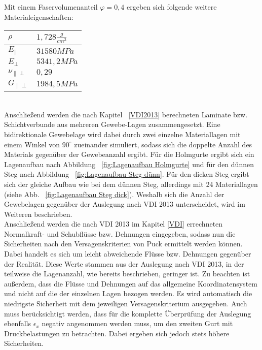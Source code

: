 \noindent Mit einem Faservolumenanteil $\varphi=0,4$ ergeben sich folgende weitere Materialeigenschaften:\\

\begin{tabular}{ll}
	$\rho$ & $1,728 \frac{g}{cm^{3}}$ \\
	\hline
	$E_{\parallel}$ & $31580 MPa$\\
	\hline
	$E_{\perp}$ & $5341,2MPa$\\
	\hline
	$\nu_{\parallel\perp}$ & $0,29$\\
	\hline
	$G_{\parallel\perp}$ & $1984,5 MPa$\\
\end{tabular}\\

\noindent Anschließend werden die nach Kapitel ~\ref{VDI2013} berechneten Laminate bzw. Schichtverbunde aus mehreren Gewebe-Lagen zusammengesetzt. Eine bidirektionale Gewebelage wird dabei durch zwei einzelne Materiallagen mit einem Winkel von $90^{\circ}$ zueinander simuliert, sodass sich die doppelte Anzahl des Materials gegenüber der Gewebeanzahl ergibt. Für die Holmgurte ergibt sich ein Lagenaufbau nach Abbildung ~\ref{fig:Lagenaufbau Holmgurte} und für den dünnen Steg nach Abbildung ~\ref{fig:Lagenaufbau Steg dünn}. Für den dicken Steg ergibt sich der gleiche Aufbau wie bei dem dünnen Steg, allerdings mit 24 Materiallagen (siehe Abb. ~\ref{fig:Lagenaufbau Steg dick}). Weshalb sich die Anzahl der Gewebelagen gegenüber der Auslegung nach VDI 2013 unterscheidet, wird im Weiteren beschrieben.\\ 

\noindent Anschließend werden die nach VDI 2013 im Kapitel \ref{VDI} errechneten Normalkraft- und Schubflüsse bzw. Dehnungen eingegeben, sodass nun die Sicherheiten nach den Versagenskriterien von Puck ermittelt werden können. Dabei handelt es sich um leicht abweichende Flüsse bzw. Dehnungen gegenüber der Realität. Diese Werte stammen aus der Auslegung nach VDI 2013, in der teilweise die Lagenanzahl, wie bereits beschrieben, geringer ist. Zu beachten ist außerdem, dass die Flüsse und Dehnungen auf das allgemeine Koordinatensystem und nicht auf die der einzelnen Lagen bezogen werden. Es wird automatisch die niedrigste Sicherheit mit dem jeweiligen Versagenskriterium ausgegeben. Auch muss berücksichtigt werden, dass für die komplette Überprüfung der Auslegung ebenfalls $\epsilon_{x}$ negativ angenommen werden muss, um den zweiten Gurt mit Druckbelastungen zu betrachten. Dabei ergeben sich jedoch stets höhere Sicherheiten.\\

